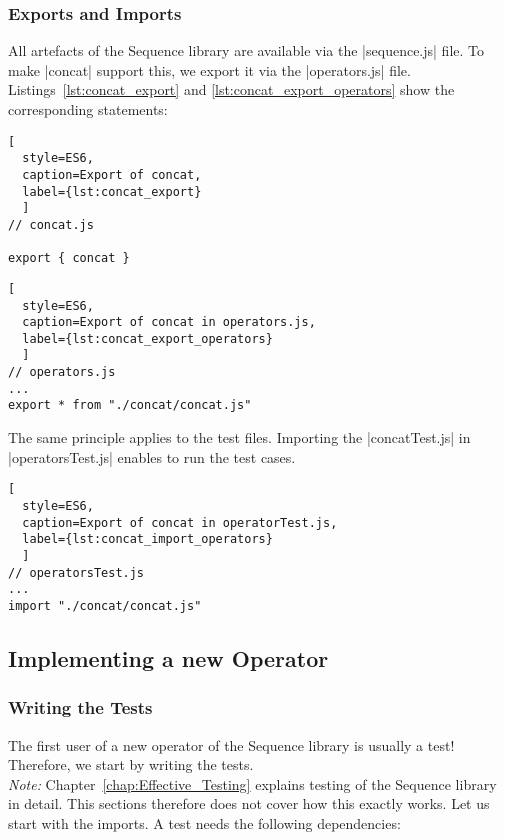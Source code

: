 \subsubsection{Exports and Imports}
\label{subsub:Exports and Imports}
All artefacts of the Sequence library are available via the |sequence.js| file.
To make |concat| support this, we export it via the |operators.js| file.
Listings~\ref{lst:concat_export} and \ref{lst:concat_export_operators} show the
corresponding statements:

\begin{lstlisting}[
  style=ES6, 
  caption=Export of concat,
  label={lst:concat_export}
  ]
// concat.js

export { concat }
\end{lstlisting}



\begin{lstlisting}[
  style=ES6, 
  caption=Export of concat in operators.js,
  label={lst:concat_export_operators}
  ]
// operators.js
...
export * from "./concat/concat.js"
\end{lstlisting}

The same principle applies to the test files. Importing the |concatTest.js| in
|operatorsTest.js| enables to run the test cases.

\begin{lstlisting}[
  style=ES6, 
  caption=Export of concat in operatorTest.js,
  label={lst:concat_import_operators}
  ]
// operatorsTest.js
...
import "./concat/concat.js"
\end{lstlisting}

\subsection{Implementing a new Operator}
\label{subsub:Implementing a new Operator}

\subsubsection{Writing the Tests}
\label{subsub:Write the Tests}
The first user of a new operator of the Sequence library is usually a test!
Therefore, we start by writing the tests.\\
\textit{Note:} Chapter~\ref{chap:Effective_Testing} explains testing of the
Sequence library in detail. This sections therefore does not cover how this
exactly works.
\newline
Let us start with the imports. A test needs the following dependencies:

